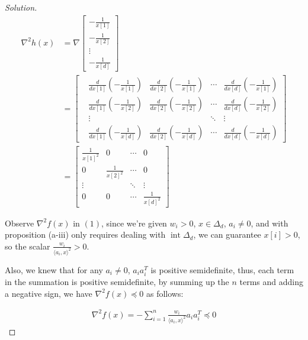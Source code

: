 \documentclass{article}
\newenvironment{solution}
  {\renewcommand\qedsymbol{$\blacksquare$}\begin{proof}[Solution]}
  {\end{proof}}
\DeclareMathOperator{\interior}{int}
\begin{document}
\begin{solution}
\begin{align*}
    \nabla^2 h(x) 
    &= \nabla 
    \begin{bmatrix}
        -\frac{1}{x[1]} \\
        -\frac{1}{x[2]} \\
        \vdots \\
        -\frac{1}{x[d]}
    \end{bmatrix} \\
    &= 
    \begin{bmatrix}
        &\frac{d}{dx[1]} \left( -\frac{1}{x[1]} \right) &\frac{d}{dx[2]} \left( -\frac{1}{x[1]} \right) &\cdots &\frac{d}{dx[d]} \left( -\frac{1}{x[1]} \right) \\
        &\frac{d}{dx[1]} \left( -\frac{1}{x[2]} \right) &\frac{d}{dx[2]} \left( -\frac{1}{x[2]} \right) &\cdots &\frac{d}{dx[d]} \left( -\frac{1}{x[2]} \right) \\
        &\vdots & & \ddots & \vdots \\
        &\frac{d}{dx[1]} \left( -\frac{1}{x[d]} \right) &\frac{d}{dx[2]} \left( -\frac{1}{x[d]} \right) &\cdots &\frac{d}{dx[d]} \left( -\frac{1}{x[d]} \right)
    \end{bmatrix} \\
    &=
    \begin{bmatrix}
        \frac{1}{x[1]^2} & 0 & \cdots & 0 \\
        0 & \frac{1}{x[2]^2} & \cdots & 0 \\
        \vdots & & \ddots & \vdots \\
        0 & 0 & \cdots & \frac{1}{x[d]^2}
    \end{bmatrix} \tag{2}
\end{align*}

Observe $\nabla^2 f(x)$ in $(1)$, since we're given $w_i > 0$, $x \in \Delta_d$, $a_i \neq 0$, 
and with proposition (a-iii) only requires dealing with $\interior \Delta_d$,
we can guarantee $x[i] > 0$, 
so the scalar $\frac{w_i}{\langle a_i, x \rangle^2} > 0$.
\bigskip

Also, we knew that for any $a_i \neq 0$, $a_i a_i^T$ is positive semidefinite,
thus, each term in the summation is positive semidefinite, 
by summing up the $n$ terms and adding a negative sign,
we have $\nabla^2 f(x) \preceq 0$ as follows:

\begin{align*}
    \nabla^2 f(x) 
    = -\sum_{i=1}^n \frac{w_i}{\langle a_i, x \rangle^2} a_i a_i^T \preceq 0
\end{align*}




\end{solution}
\end{document}
